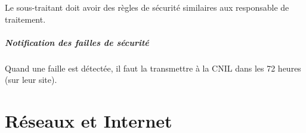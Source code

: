 \documentclass[10pt,a4paper,french]{article}
\begin{document}
Le sous-traitant doit avoir des règles de sécurité similaires aux responsable de traitement.

\subsubsection{Notification des failles de sécurité}

Quand une faille est détectée, il faut la transmettre à la CNIL dans les 72 heures (sur leur site).

\part{Réseaux et Internet}

\appendix %

\printindex
\end{document}

